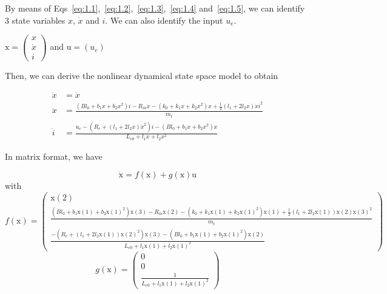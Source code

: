 By means of Eqs~\eqref{eq:1.1},~\eqref{eq:1.2},~\eqref{eq:1.3},~\eqref{eq:1.4} and~\eqref{eq:1.5}, we can identify 3 state variables $x$,  $\dot{x}$ and $i$. We can also identify the input $u_e$.

$\text{x}=\begin{pmatrix}
   x \\
   \dot{x} \\
	 i
\end{pmatrix}$ and $\text{u}=(u_e)$

Then, we can derive the nonlinear dynamical state space model to obtain

\begin{align}
   \dot{x} &= \dot{x}\\
	 \ddot{x} &= \frac{(Bl_0+b_1x+b_2x^2)i-R_m\dot{x}-(k_0+k_1x+k_2x^2)x+\frac{1}{2}(l_1+2l_2x)\dot{x}i^2}{m_t}\\
	 \dot{i} &= \frac{u_e-(R_e+(l_1+2l_2x)\dot{x}^2)i-(Bl_0+b_1x+b_2x^2)\dot{x}}{L_{e0}+l_1x+l_2x^2}
\end{align}

In matrix format, we have

\begin{equation}
	\label{eq:eqModel}
	\dot{\text{x}}=f(\text{x})+g(\text{x})\text{u}
\end{equation}
with
\begin{equation}
	\label{eq:f(x)}
	f(\text{x})=\begin{pmatrix}
   \text{x}(2) \\
	 \frac{(Bl_0+b_1\text{x}(1)+b_2\text{x}(1)^2)\text{x}(3)-R_m\text{x}(2)-(k_0+k_1\text{x}(1)+k_2\text{x}(1)^2)\text{x}(1)+\frac{1}{2}(l_1+2l_2\text{x}(1))\text{x}(2)\text{x}(3)^2}{m_t}\\
	 \frac{-(R_e+(l_1+2l_2\text{x}(1))\text{x}(2)^2)\text{x}(3)-(Bl_0+b_1\text{x}(1)+b_2\text{x}(1)^2)\text{x}(2)}{L_{e0}+l_1\text{x}(1)+l_2\text{x}(1)^2}
\end{pmatrix}
\end{equation}
\begin{equation}
	\label{eq:g(u)}
	g(\text{x})=\begin{pmatrix}
   0\\
   0 \\
   \frac{1}{L_{e0}+l_1\text{x}(1)+l_2\text{x}(1)^2}
\end{pmatrix}
\end{equation}
